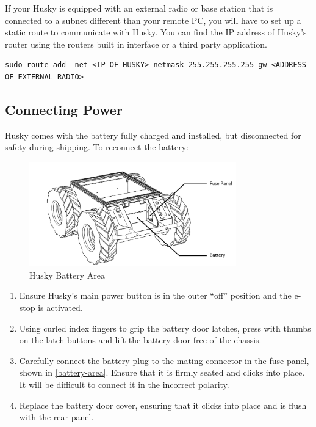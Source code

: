 \documentclass[]{clearpath-latex/clearpath-manual}
\begin{document}
If your Husky is equipped with an external radio or base station that is connected to a subnet different than your remote PC, 
you will have to set up a static route to communicate with Husky. You can find the IP address of Husky’s 
router using the routers built in interface or a third party application.
\begin{lstlisting} 
sudo route add -net <IP OF HUSKY> netmask 255.255.255.255 gw <ADDRESS OF EXTERNAL RADIO>
\end{lstlisting}

\newpage

\subsection{Connecting Power}
Husky comes with the battery fully charged and installed, but disconnected for safety during shipping. 
To reconnect the battery:

\begin{figure}[h]
	\centering
	\includegraphics[width=0.8\textwidth]{battery-area.png}
	\caption{Husky Battery Area}
	\label{battery-area}
\end{figure}

\begin{enumerate}
	\item Ensure Husky’s main power button is in the outer “off” position and the e-stop is activated.
	\item Using curled index fingers to grip the battery door latches, press with thumbs on the latch buttons and lift the battery door free of the chassis.
	\item Carefully connect the battery plug to the mating connector in the fuse panel, shown in \autoref{battery-area}. Ensure that it is firmly seated and clicks into place. It will be difficult to connect it in the incorrect polarity.
	\item Replace the battery door cover, ensuring that it clicks into place and is flush with the rear panel.
\end{enumerate}
\end{document}
